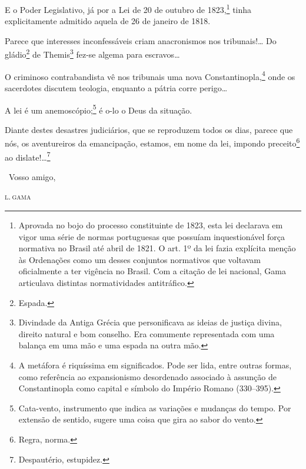E o Poder Legislativo, já por a Lei de 20 de outubro de 1823,\footnote{
  Aprovada no bojo do processo constituinte de 1823, esta lei declarava
  em vigor uma série de normas portuguesas que possuíam inquestionável
  força normativa no Brasil até abril de 1821. O art. 1º da lei fazia
  explícita menção às Ordenações como um desses conjuntos normativos que
  voltavam oficialmente a ter vigência no Brasil. Com a citação de lei
  nacional, Gama articulava distintas normatividades
  antitráfico.} tinha
explicitamente admitido aquela de 26 de janeiro de 1818.

Parece que interesses inconfessáveis criam anacronismos nos
tribunais!\ldots{} Do gládio\footnote{Espada.} de Themis\footnote{
  Divindade da Antiga Grécia que personificava as ideias de justiça
  divina, direito natural e bom conselho. Era comumente representada com
  uma balança em uma mão e uma espada na outra mão.} fez-se algema para
escravos\ldots{}

O criminoso contrabandista vê nos tribunais uma nova Constantinopla,\footnote{A metáfora é riquíssima em significados. Pode ser lida, 
  entre outras formas, como referência ao expansionismo desordenado
  associado à assunção de Constantinopla como capital e símbolo do
  Império Romano (330--395).} onde os sacerdotes discutem teologia,
enquanto a pátria corre perigo\ldots{}

A lei é um anemoscópio;\footnote{Cata-vento, instrumento que indica as
  variações e mudanças do tempo. Por extensão de sentido, sugere uma
  coisa que gira ao sabor do vento.} é o-lo o Deus da situação.

Diante destes desastres judiciários, que se reproduzem todos os dias,
parece que nós, os aventureiros da emancipação, estamos, em nome da lei,
impondo preceito\footnote{Regra, norma.} ao dislate!\ldots{}\footnote{
  Despautério, estupidez.}

\medskip

\hfill\ Vosso amigo,

\hfill\textsc{l.\,gama}


